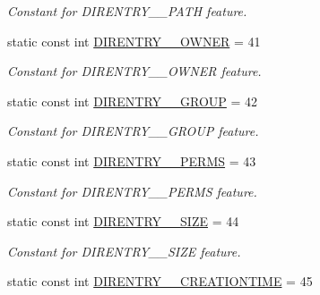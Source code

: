 \begin{DoxyCompactItemize}
\begin{DoxyCompactList}\small\item\em Constant for DIRENTRY\_\-\_\-PATH feature. \item\end{DoxyCompactList}\item 
\hypertarget{classFMS__Data_1_1FMS__DataPackage_a635156e92388486b228b3cdef1d13f81}{
static const int \hyperlink{classFMS__Data_1_1FMS__DataPackage_a635156e92388486b228b3cdef1d13f81}{DIRENTRY\_\-\_\-OWNER} = 41}
\label{classFMS__Data_1_1FMS__DataPackage_a635156e92388486b228b3cdef1d13f81}

\begin{DoxyCompactList}\small\item\em Constant for DIRENTRY\_\-\_\-OWNER feature. \item\end{DoxyCompactList}\item 
\hypertarget{classFMS__Data_1_1FMS__DataPackage_ab34c3119b8bfdf55de58daa8013f2efa}{
static const int \hyperlink{classFMS__Data_1_1FMS__DataPackage_ab34c3119b8bfdf55de58daa8013f2efa}{DIRENTRY\_\-\_\-GROUP} = 42}
\label{classFMS__Data_1_1FMS__DataPackage_ab34c3119b8bfdf55de58daa8013f2efa}

\begin{DoxyCompactList}\small\item\em Constant for DIRENTRY\_\-\_\-GROUP feature. \item\end{DoxyCompactList}\item 
\hypertarget{classFMS__Data_1_1FMS__DataPackage_a97461f59abd06a109926ae09b9d9a8d7}{
static const int \hyperlink{classFMS__Data_1_1FMS__DataPackage_a97461f59abd06a109926ae09b9d9a8d7}{DIRENTRY\_\-\_\-PERMS} = 43}
\label{classFMS__Data_1_1FMS__DataPackage_a97461f59abd06a109926ae09b9d9a8d7}

\begin{DoxyCompactList}\small\item\em Constant for DIRENTRY\_\-\_\-PERMS feature. \item\end{DoxyCompactList}\item 
\hypertarget{classFMS__Data_1_1FMS__DataPackage_a211d6266ca984a1ae9a1b3c685ee0a4a}{
static const int \hyperlink{classFMS__Data_1_1FMS__DataPackage_a211d6266ca984a1ae9a1b3c685ee0a4a}{DIRENTRY\_\-\_\-SIZE} = 44}
\label{classFMS__Data_1_1FMS__DataPackage_a211d6266ca984a1ae9a1b3c685ee0a4a}

\begin{DoxyCompactList}\small\item\em Constant for DIRENTRY\_\-\_\-SIZE feature. \item\end{DoxyCompactList}\item 
\hypertarget{classFMS__Data_1_1FMS__DataPackage_a435a4214833fb5e752b77f957465858c}{
static const int \hyperlink{classFMS__Data_1_1FMS__DataPackage_a435a4214833fb5e752b77f957465858c}{DIRENTRY\_\-\_\-CREATIONTIME} = 45}
\label{classFMS__Data_1_1FMS__DataPackage_a435a4214833fb5e752b77f957465858c}


\end{DoxyCompactItemize}
